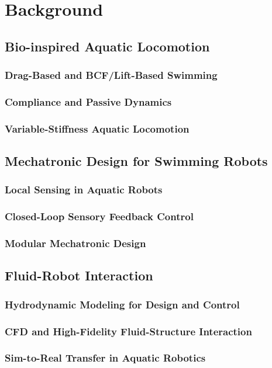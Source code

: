 
\chapter{Background} \label{chapBackground}

\section{Bio-inspired Aquatic Locomotion}
\subsection{Drag-Based and BCF/Lift-Based Swimming}
\subsection{Compliance and Passive Dynamics}
\subsection{Variable-Stiffness Aquatic Locomotion}

\section{Mechatronic Design for Swimming Robots}
\subsection{Local Sensing in Aquatic Robots}
\subsection{Closed-Loop Sensory Feedback Control}
\subsection{Modular Mechatronic Design}

\section{Fluid-Robot Interaction}
\subsection{Hydrodynamic Modeling for Design and Control}
\subsection{CFD and High-Fidelity Fluid-Structure Interaction}

\subsection{Sim-to-Real Transfer in Aquatic Robotics}
